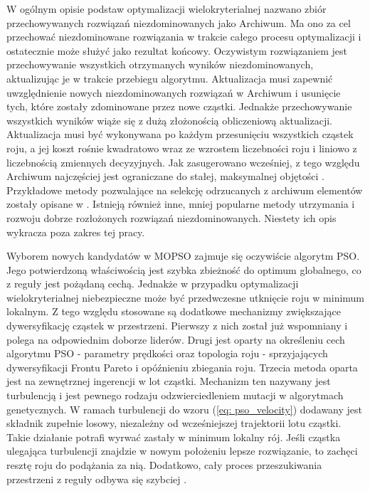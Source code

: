 W ogólnym opisie podstaw optymalizacji wielokryterialnej nazwano zbiór przechowywanych rozwiązań niezdominowanych jako Archiwum. Ma ono za cel przechować niezdominowane rozwiązania w trakcie całego procesu optymalizacji i ostatecznie może służyć jako rezultat końcowy. Oczywistym rozwiązaniem jest przechowywanie wszystkich otrzymanych wyników niezdominowanych, aktualizując je w trakcie przebiegu algorytmu. Aktualizacja musi zapewnić uwzględnienie nowych niezdominowanych rozwiązań w Archiwum i usunięcie tych, które zostały zdominowane przez nowe cząstki. Jednakże przechowywanie wszystkich wyników wiąże się z dużą złożonością obliczeniową aktualizacji. Aktualizacja musi być wykonywana po każdym przesunięciu wszystkich cząstek roju, a jej koszt rośnie kwadratowo wraz ze wzrostem liczebności roju i liniowo z liczebnością zmiennych decyzyjnych. Jak zasugerowano wcześniej, z tego względu Archiwum najczęściej jest ograniczane do stałej, maksymalnej objętości \parencite{Coello2007}. Przykładowe metody pozwalające na selekcję odrzucanych z archiwum elementów zostały opisane w \parencite{Zitzler1999,Knowles2000}. Istnieją również inne, mniej popularne metody utrzymania i rozwoju dobrze rozłożonych rozwiązań niezdominowanych. Niestety ich opis wykracza poza zakres tej pracy.

Wyborem nowych kandydatów w MOPSO zajmuje się oczywiście algorytm PSO. Jego potwierdzoną właściwością jest szybka zbieżność do optimum globalnego, co z reguły jest pożądaną cechą. Jednakże w przypadku optymalizacji wielokryterialnej niebezpieczne może być przedwczesne utknięcie roju w minimum lokalnym. Z tego względu stosowane są dodatkowe mechanizmy zwiększające dywersyfikację cząstek w przestrzeni. Pierwszy z nich został już wspomniany i polega na odpowiednim doborze liderów. Drugi jest oparty na określeniu cech algorytmu PSO - parametry prędkości oraz topologia roju - sprzyjających dywersyfikacji Frontu Pareto i opóźnieniu zbiegania roju. Trzecia metoda oparta jest na zewnętrznej ingerencji w lot cząstki. Mechanizm ten nazywany jest turbulencją \parencite{Fieldsend} i jest pewnego rodzaju odzwierciedleniem mutacji w algorytmach genetycznych. W ramach turbulencji do wzoru (\ref{eq: pso_velocity}) dodawany jest składnik zupełnie losowy, niezależny od wcześniejszej trajektorii lotu cząstki. Takie działanie potrafi wyrwać zastały w minimum lokalny rój. Jeśli cząstka ulegająca turbulencji znajdzie w nowym położeniu lepsze rozwiązanie, to zachęci resztę roju do podążania za nią. Dodatkowo, cały proces przeszukiwania przestrzeni z reguły odbywa się szybciej \parencite{Stacey2003}.

